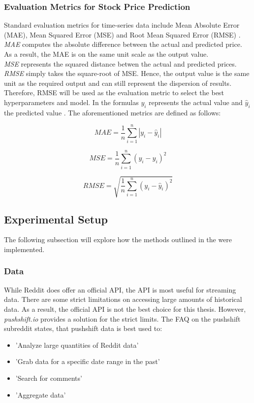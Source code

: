 \documentclass[11pt, a4paper]{article}
\begin{document}
\subsubsection{Evaluation Metrics for Stock Price Prediction}
Standard evaluation metrics for time-series data include Mean Absolute Error (MAE), Mean Squared Error (MSE) and Root Mean Squared Error (RMSE) \citep{rezaei2021stockpriceprediction}.\\
\emph{MAE} computes the absolute difference between the actual and predicted price. As a result, the MAE is on the same unit scale as
the output value.\\
\emph{MSE} represents the squared distance betwen the actual and predicted prices. \\
\emph{RMSE} simply takes the square-root of MSE. Hence, the output value is the same unit as the required output and can still represent the
dispersion of results. Therefore, RMSE will be used as the evaluation metric to select the best hyperparameters and model.
In the formulas $y_{i}$ represents the actual value and $\hat{y}_i$ the predicted value \citep{chen2021meanvariance}.
The aforementioned metrics are defined as follows:

\begin{equation*}
    MAE = \frac{1}{n}\sum_{i=1}^{n}|y_{i}-\hat{y}_{i}|
\end{equation*}

\begin{equation*}
    MSE = \frac{1}{n}\sum_{i=1}^{n}(y_{i}-\hat{y}_{i})^2
\end{equation*}

\begin{equation*}
    RMSE = \sqrt{\frac{1}{n}\sum_{i=1}^{n}(y_{i}-\hat{y}_{i})^2}
\end{equation*}


\subsection{Experimental Setup}
The following subsection will explore how the methods outlined in the  were implemented.

\subsubsection{Data}

While Reddit does offer an official API, the API is most useful for streaming data. 
There are some strict limitations on accessing large amounts of historical data. As a result, the official API is not the best choice for this thesis. 
However, \emph{pushshift.io} provides a solution for the strict limits.
The FAQ on the pushshift subreddit states, that pushshift data is best used to:
\begin{itemize}
    \item 'Analyze large quantities of Reddit data'
    \item 'Grab data for a specific date range in the past'
    \item 'Search for comments'
    \item 'Aggregate data'
\end{itemize}
\end{document}

